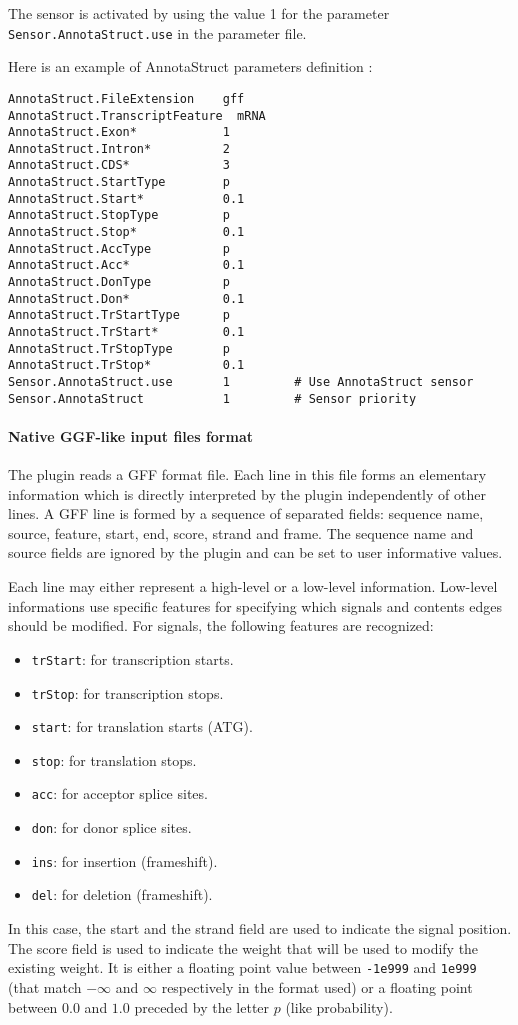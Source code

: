 The sensor is activated by using the value 1 for the parameter
\texttt{Sensor.AnnotaStruct.use} in the parameter file.

Here is an example of AnnotaStruct parameters definition :
\begin{Verbatim}[fontsize=\small]
AnnotaStruct.FileExtension    gff
AnnotaStruct.TranscriptFeature  mRNA
AnnotaStruct.Exon*            1
AnnotaStruct.Intron*          2
AnnotaStruct.CDS*             3
AnnotaStruct.StartType        p 
AnnotaStruct.Start*           0.1
AnnotaStruct.StopType         p 
AnnotaStruct.Stop*            0.1
AnnotaStruct.AccType          p 
AnnotaStruct.Acc*             0.1
AnnotaStruct.DonType          p 
AnnotaStruct.Don*             0.1
AnnotaStruct.TrStartType      p 
AnnotaStruct.TrStart*         0.1
AnnotaStruct.TrStopType       p 
AnnotaStruct.TrStop*          0.1
Sensor.AnnotaStruct.use       1         # Use AnnotaStruct sensor
Sensor.AnnotaStruct           1         # Sensor priority
\end{Verbatim}

\paragraph{Native GGF-like input files format}

The plugin reads a GFF format file. Each line in this file forms an
elementary information which is directly interpreted by the plugin
independently of other lines. A GFF line is formed by a sequence of
separated fields: sequence name, source, feature, start, end, score,
strand and frame. The sequence name and source fields are ignored by
the plugin and can be set to user informative values.

Each line may either represent a high-level or a low-level
information.  Low-level informations use specific features for
specifying which signals and contents edges should be modified. For
signals, the following features are recognized:
\begin{itemize}
\item \texttt{trStart}: for transcription starts.
\item \texttt{trStop}: for transcription stops.
\item \texttt{start}: for translation starts (ATG).
\item \texttt{stop}: for translation stops.
\item \texttt{acc}: for acceptor splice sites.
\item \texttt{don}: for donor splice sites.
\item \texttt{ins}: for insertion (frameshift).
\item \texttt{del}: for deletion (frameshift).
\end{itemize}
In this case, the start and the strand field are used to indicate the
signal position. The score field is used to indicate the weight that
will be used to modify the existing weight. It is either a floating
point value between \texttt{-1e999} and \texttt{1e999} (that match
$-\infty$ and $\infty$ respectively in the format used) or a floating point
between $0.0$ and $1.0$ preceded by the letter $p$ (like probability).

